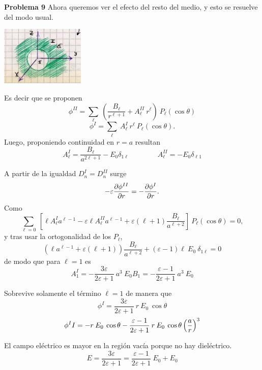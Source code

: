 \documentclass[10pt,oneside]{CBFT_book}
\begin{document}
\begin{ejemplo}{\bf Problema 9}
Ahora queremos ver el efecto del resto del medio, y esto se resuelve del
modo usual.

\includegraphics[width=0.3\textwidth]{images/fig_ft1_problema9C_medios.jpg} 

Es decir que se proponen
\[
	\phi^{II} = \sum_\ell \: \left( \frac{B_\ell}{r^{\ell+1}} +
	A_\ell^{II} \: r^\ell \right) \: P_\ell(\cos\theta)
\]
\[
	\phi^{I} = \sum_\ell \: A_\ell^I \: r^\ell \: P_\ell(\cos\theta).
\]
Luego, proponiendo continuidad en $r=a$ resultan
\[
	A_\ell^{I} = \frac{B_\ell}{a^{2\ell + 1}} - E_0\delta_{1\ell} \qquad 
	\qquad A_\ell^{II} = -E_0 \delta_{\ell 1}
\]


A partir de la igualdad $ D_{n}^I = D_n^{II}$ surge 
\[
	-\varepsilon \frac{\partial^{\hspace{-0.05em}} {\phi^{II}}}{\partial {r}^{\hspace{-0.05em}}} = -  \frac{\partial^{\hspace{-0.05em}} {\phi^{I}}}{\partial {r}^{\hspace{-0.05em}}}.
\]
Como 
\[
	\sum_{\ell=0} \: 
	\left[ 
	\ell A_\ell^I a^{\ell -1} - \varepsilon \ell A_\ell^{II} a^{\ell-1} 
	+ \varepsilon (\ell + 1) \frac{B_\ell}{a^{\ell+2}}
	\right] \: P_\ell(\cos\theta) = 0 ,
\]
y tras usar la ortogonalidad de los $P_\ell$,
\[
	\left( \ell a^{\ell-1} + \varepsilon (\ell + 1) \right) \frac{B_\ell}{a^{\ell+2}}
	+ (\varepsilon - 1 ) \ell \: E_0 \: \delta_{1\ell} = 0
\]
de modo que para $ \ell = 1 $ es
\[
	A_1^I = - \frac{3\varepsilon}{2\varepsilon +1} \: a^3 \: E_0
	B_1 = - \frac{\varepsilon -1}{2\varepsilon +1} \: a^3 \: E_0
\]

Sobrevive solamente el término $\ell=1$ de manera que
\[
	\phi^I = \frac{3\varepsilon}{2\varepsilon +1} \: r \: E_0 \: \cos\theta 
\]
\[
	\phi^II = - r \: E_0 \: \cos\theta - \frac{\varepsilon -1}{2\varepsilon +1} 
	\: r \: E_0 \: \cos\theta \left( \frac{ a }{ r } \right)^3
\]

El campo eléctrico es mayor en la región vacía porque no hay dieléctrico.
\[
	E = \frac{3\varepsilon}{2\varepsilon +1} =
	\frac{\varepsilon-1}{2\varepsilon +1} \: E_0 + E_0
\]
 

\end{ejemplo}
\end{document}
